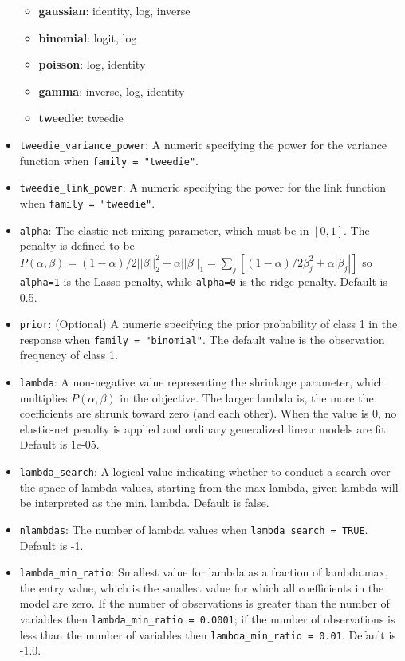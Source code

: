 \begin{itemize}
	\begin{itemize}
\item	{\textbf {gaussian}}: identity, log, inverse 
\item {\textbf{binomial}}: logit, log 
\item {\textbf{poisson}}: log, identity
\item {\textbf{gamma}}: inverse, log, identity
\item {\textbf{tweedie}}: tweedie 
	\end{itemize}
\item \texttt{tweedie\_variance\_power}: A numeric specifying the power for the variance function when \texttt{family = "tweedie"}. 
\item \texttt{tweedie\_link\_power}: A numeric specifying the power for the link function when \texttt{family = "tweedie"}. 
\item \texttt{alpha}: The elastic-net mixing parameter, which must be in $[0,1]$. The penalty is defined to be $P(\alpha,\beta) = (1-\alpha)/2||\beta||_2^2 + \alpha||\beta||_1 = \sum_j [(1-\alpha)/2 \beta_j^2 + \alpha|\beta_j|] $ so \texttt{alpha=1} is the Lasso penalty, while \texttt{alpha=0} is the ridge penalty. Default is 0.5.
\item \texttt{prior}: (Optional) A numeric specifying the prior probability of class 1 in the response when \texttt{family = "binomial"}. The default value is the observation frequency of class 1. 
\item \texttt{lambda}: A non-negative value representing the shrinkage parameter, which multiplies $P(\alpha,\beta)$ in the objective. The larger lambda is, the more the coefficients are shrunk toward zero (and each other). When the value is 0, no elastic-net penalty is applied and ordinary generalized linear models are fit. Default is 1e-05.
\item \texttt{lambda\_search}: A logical value indicating whether to conduct a search over the space of lambda values, starting from the max lambda, given lambda will be interpreted as the min. lambda. Default is false.
\item \texttt{nlambdas}: The number of lambda values when \texttt{lambda\_search = TRUE}. Default is -1.
\item \texttt{lambda\_min\_ratio}: Smallest value for lambda as a fraction of lambda.max, the entry value, which is the smallest value for which all coefficients in the model are zero. If the number of observations is greater than the number of variables then \texttt{lambda\_min\_ratio = 0.0001}; if the number of observations is less than the number of variables then \texttt{lambda\_min\_ratio = 0.01}. Default is -1.0.

\end{itemize}
